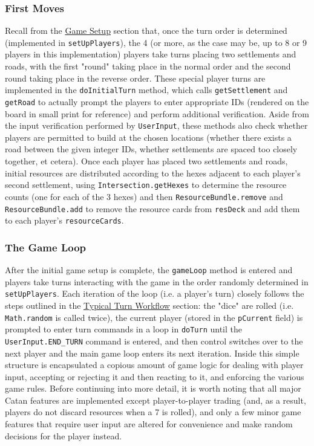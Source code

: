 \documentclass[pageno]{jpaper}
\begin{document}
\begin{doublespacing}
\hypertarget{sec:first_moves}{}
\subsubsection{First Moves}

Recall from the \hyperlink{sec:game_setup}{Game Setup} section that, once the turn order is determined (implemented in \lstinline$setUpPlayers$), the 4 (or more, as the case may be, up to 8 or 9 players in this implementation) players take turns placing two settlements and roads, with the first "round" taking place in the normal order and the second round taking place in the reverse order. These special player turns are implemented in the \lstinline$doInitialTurn$ method, which calls \lstinline$getSettlement$ and \lstinline$getRoad$ to actually prompt the players to enter appropriate IDs (rendered on the board in small print for reference) and perform additional verification. Aside from the input verification performed by \lstinline$UserInput$, these methods also check whether players are permitted to build at the chosen locations (whether there exists a road between the given integer IDs, whether settlements are spaced too closely together, et cetera). Once each player has placed two settlements and roads, initial resources are distributed according to the hexes adjacent to each player's second settlement, using \lstinline$Intersection.getHexes$ to determine the resource counts (one for each of the 3 hexes) and then \lstinline$ResourceBundle.remove$ and \lstinline$ResourceBundle.add$ to remove the resource cards from \lstinline$resDeck$ and add them to each player's \lstinline$resourceCards$.

\hypertarget{sec:the_game_loop}{}
\subsubsection{The Game Loop}

After the initial game setup is complete, the \lstinline$gameLoop$ method is entered and players take turns interacting with the game in the order randomly determined in \lstinline$setUpPlayers$. Each iteration of the loop (i.e. a player's turn) closely follows the steps outlined in the \hyperlink{sec:typical_turn_workflow}{Typical Turn Workflow} section: the "dice" are rolled (i.e. \lstinline$Math.random$ is called twice), the current player (stored in the \lstinline$pCurrent$ field) is prompted to enter turn commands in a loop in \lstinline$doTurn$ until the \lstinline$UserInput.END_TURN$ command is entered, and then control switches over to the next player and the main game loop enters its next iteration. Inside this simple structure is encapsulated a copious amount of game logic for dealing with player input, accepting or rejecting it and then reacting to it, and enforcing the various game rules. Before continuing into more detail, it is worth noting that all major Catan features are implemented except player-to-player trading (and, as a result, players do not discard resources when a 7 is rolled), and only a few minor game features that require user input are altered for convenience and make random decisions for the player instead.


\end{doublespacing}
\end{document}
